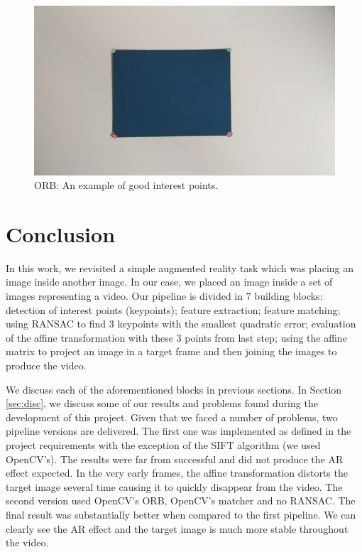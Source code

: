\documentclass[]{IEEEtran}
\begin{document}
\begin{figure}[h]
  \includegraphics[width=\linewidth]{./figures/good_orb.png}
  \caption{ORB: An example of good interest points.}
  \label{fig:good_orb}
\end{figure}

\section{Conclusion}
In this work, we revisited a simple augmented reality task which was placing an image inside another image. In our case, we placed an image inside a set of images representing a video. Our pipeline is divided in $7$ building blocks: detection of interest points (keypoints); feature extraction; feature matching; using RANSAC to find $3$ keypoints with the smallest quadratic error; evaluation of the affine transformation with these $3$ points from last step; using the affine matrix to project an image in a target frame and then joining the images to produce the video.

We discuss each of the aforementioned blocks in previous sections. In Section \ref{sec:disc}, we discuss some of our results and problems found during the development of this project. Given that we faced a number of problems, two pipeline versions are delivered. The first one was implemented as defined in the project requirements with the exception of the SIFT algorithm (we used OpenCV's). The results were far from successful and did not produce the AR effect expected. In the very early frames, the affine transformation distorts the target image several time causing it to quickly disappear from the video. The second version used OpenCV's ORB, OpenCV's matcher and no RANSAC. The final result was substantially better when compared to the first pipeline. We can clearly see the AR effect and the target image is much more stable throughout the video.
\end{document}
